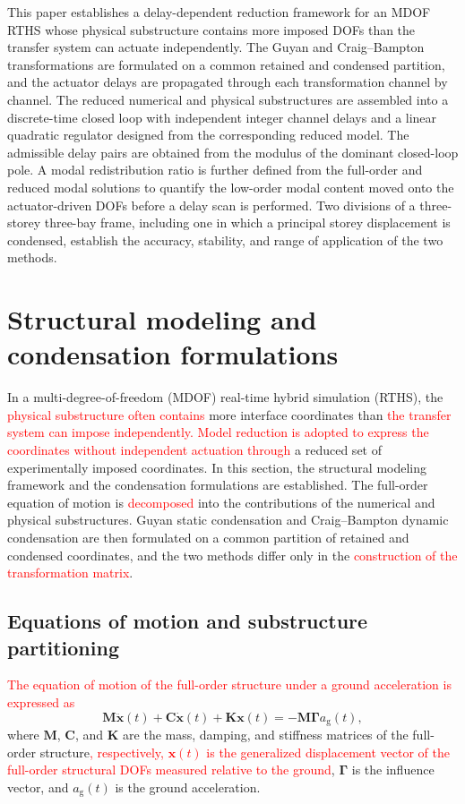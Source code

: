 \documentclass[11pt,a4paper]{article}
\numberwithin{equation}{section}
\newcommand{\rev}[1]{\textcolor{red}{#1}}
\begin{document}
This paper establishes a delay-dependent reduction framework for an MDOF RTHS whose physical substructure contains more imposed DOFs than the transfer system can actuate independently. The Guyan and Craig--Bampton transformations are formulated on a common retained and condensed partition, and the actuator delays are propagated through each transformation channel by channel. The reduced numerical and physical substructures are assembled into a discrete-time closed loop with independent integer channel delays and a linear quadratic regulator designed from the corresponding reduced model. The admissible delay pairs are obtained from the modulus of the dominant closed-loop pole. A modal redistribution ratio is further defined from the full-order and reduced modal solutions to quantify the low-order modal content moved onto the actuator-driven DOFs before a delay scan is performed. Two divisions of a three-storey three-bay frame, including one in which a principal storey displacement is condensed, establish the accuracy, stability, and range of application of the two methods.

\section{Structural modeling and condensation formulations} \label{sec2}

In a multi-degree-of-freedom (MDOF) real-time hybrid simulation (RTHS), the \rev{physical substructure often contains} more interface coordinates than \rev{the transfer system can impose independently. Model reduction is adopted to express the coordinates without independent actuation through} a reduced set of experimentally imposed coordinates.
In this section, the structural modeling framework and the condensation formulations are established. The full-order equation of motion is \rev{decomposed} into the contributions of the numerical and physical substructures. Guyan static condensation and Craig--Bampton dynamic condensation are then formulated on a common partition of retained and condensed coordinates, and the two methods differ only in the \rev{construction of the transformation matrix}.

\subsection{Equations of motion and substructure partitioning}
\rev{The equation of motion of the full-order structure under a ground acceleration is expressed as}
\begin{equation}
	\mathbf{M}\ddot{\bm{x}}(t)+\mathbf{C}\dot{\bm{x}}(t)+\mathbf{K}\bm{x}(t)
	=-\mathbf{M}\bm{\Gamma}a_{\mathrm{g}}(t),
	\label{eq:full-order-eom}
\end{equation}
where \(\mathbf{M}\), \(\mathbf{C}\), and \(\mathbf{K}\) are the mass, damping, and stiffness matrices of the full-order structure\rev{, respectively, \(\bm{x}(t)\) is the generalized displacement vector of the full-order structural DOFs measured relative to the ground}, \(\bm{\Gamma}\) is the influence vector, and \(a_{\mathrm{g}}(t)\) is the ground acceleration.
\end{document}

